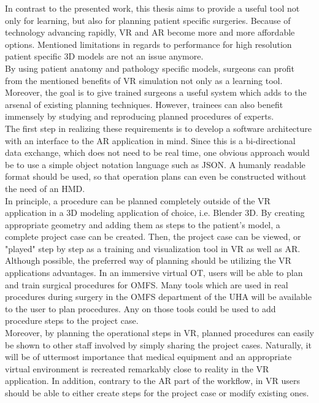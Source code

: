 In contrast to the presented work, this thesis aims to provide a useful tool not only for learning, but also for planning patient specific surgeries.
Because of technology advancing rapidly, VR and AR become more and more affordable options.
Mentioned limitations in regards to performance for high resolution patient specific 3D models are not an issue anymore.
\\ By using patient anatomy and pathology specific models, surgeons can profit from the mentioned benefits of VR simulation not only as a learning tool.
Moreover, the goal is to give trained surgeons a useful system which adds to the arsenal of existing planning techniques.
However, trainees can also benefit immensely by studying and reproducing planned procedures of experts.
\\ The first step in realizing these requirements is to develop a software architecture with an interface to the AR application in mind.
Since this is a bi-directional data exchange, which does not need to be real time, one obvious approach would be to use a simple object notation language such as JSON.
A humanly readable format should be used, so that operation plans can even be constructed without the need of an HMD.
\\ In principle, a procedure can be planned completely outside of the VR application in a 3D modeling application of choice, i.e. Blender 3D.
By creating appropriate geometry and adding them as steps to the patient's model, a complete project case can be created.
Then, the project case can be viewed, or "played" step by step as a training and visualization tool in VR as well as AR.
\\ Although possible, the preferred way of planning should be utilizing the VR applications advantages.
In an immersive virtual OT, users will be able to plan and train surgical procedures for OMFS.
Many tools which are used in real procedures during surgery in the OMFS department of the UHA will be available to the user to plan procedures.
Any on those tools could be used to add procedure steps to the project case.
\\ Moreover, by planning the operational steps in VR, planned procedures can easily be shown to other staff involved by simply sharing the project cases.
Naturally, it will be of uttermost importance that medical equipment and an appropriate virtual environment is recreated remarkably close to reality in the VR application.
In addition, contrary to the AR part of the workflow, in VR users should be able to either create steps for the project case or modify existing ones.
